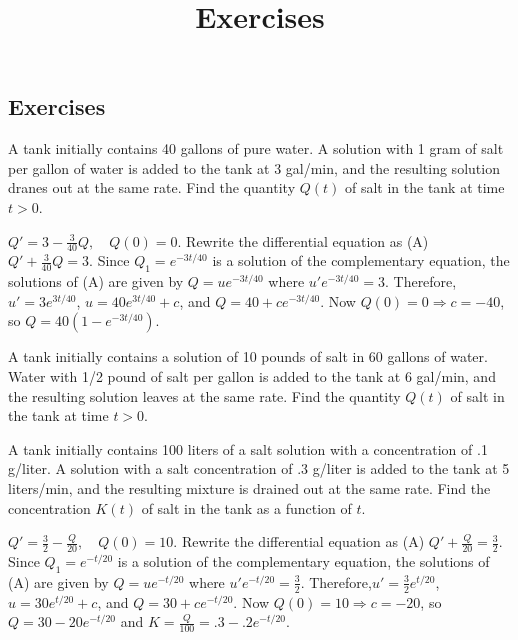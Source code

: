 \documentclass{ximera}
\title{Exercises} \license{CC BY-NC-SA 4.0}
\begin{document}
\begin{abstract}
\end{abstract}
\maketitle

\begin{onlineOnly}
\section*{Exercises}
\end{onlineOnly}


\begin{problem}\label{exer:4.2.8}
A tank initially contains 40 gallons of pure water.  A
solution with 1 gram of salt per gallon of water is added
to the tank at 3 gal/min, and the  resulting
solution dranes out at the same rate.  Find the quantity $Q(t)$
of salt in the tank at time $t > 0$.

\begin{solution}
$Q'=3-\frac{3}{40}Q,\quad Q(0)=0$. Rewrite the differential equation
as (A) $Q'+\frac{3}{40}Q=3$. Since $Q_1=e^{-3t/40}$ is a solution of
the complementary equation, the solutions of (A) are given by
$Q=ue^{-3t/40}$ where $u'e^{-3t/40}=3$. Therefore,$u'=3e^{3t/40}$,
$u=40e^{3t/40}+c$, and $Q=40+ce^{-3t/40}$. Now $Q(0)=0\Rightarrow
c=-40$, so $Q=40(1-e^{-3t/40})$.
\end{solution}
\end{problem}

\begin{problem}\label{exer:4.2.9}
A tank initially contains a solution of 10 pounds of salt in
60 gallons of water.  Water with 1/2 pound of salt per
gallon is added to the tank at 6 gal/min, and the
 resulting solution leaves at the same rate.
Find the quantity $Q(t)$ of salt in the tank at time
$t > 0$.
\end{problem}

\begin{problem}\label{exer:4.2.10}
A  tank initially contains 100 liters of a salt solution
with a concentration of .1 g/liter.  A solution with a
salt concentration of .3 g/liter is added to the tank at
5 liters/min, and the resulting mixture is
drained out at the same rate.  Find the concentration $K(t)$
of salt in the tank as a function of $t$.

\begin{solution}
$Q'=\frac{3}{2}-\frac{Q}{20},\quad Q(0)=10$. Rewrite the
differential equation as (A) $Q'+\frac{Q}{20}=\frac{3}{2}$. Since
$Q_1=e^{-t/20}$ is a solution of the complementary equation, the
solutions of (A) are given by $Q=ue^{-t/20}$ where
$u'e^{-t/20}=\frac{3}{2}$. Therefore,$u'=\frac{3}{2}e^{t/20}$,
$u=30e^{t/20}+c$, and $Q=30+ce^{-t/20}$. Now $Q(0)=10\Rightarrow
c=-20$, so $Q=30-20e^{-t/20}$ and $K=\frac{Q}{100}=.3-.2e^{-t/20}$.
\end{solution}
\end{problem}
\end{document}
